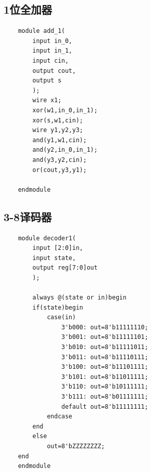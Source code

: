 \documentclass[fontset=windows,12pt]{article}
\begin{document}
    \subsection{1位全加器}
    {\setmainfont{Courier New Bold}                          %
    \begin{lstlisting}
    module add_1(
        input in_0,
        input in_1,
        input cin,
        output cout,
        output s
        );
        wire x1;
        xor(w1,in_0,in_1);
        xor(s,w1,cin);
        wire y1,y2,y3;
        and(y1,w1,cin);
        and(y2,in_0,in_1);
        and(y3,y2,cin);
        or(cout,y3,y1);
        
    endmodule
    \end{lstlisting}}
    \subsection{3-8译码器}
    {\setmainfont{Courier New Bold}                          %
    \begin{lstlisting}
    module decoder1(
        input [2:0]in,
        input state,
        output reg[7:0]out
        );
    
        always @(state or in)begin
        if(state)begin
            case(in)
                3'b000: out=8'b11111110;
                3'b001: out=8'b11111101;
                3'b010: out=8'b11111011;
                3'b011: out=8'b11110111;
                3'b100: out=8'b11101111;
                3'b101: out=8'b11011111;
                3'b110: out=8'b10111111;
                3'b111: out=8'b01111111;
                default out=8'b11111111;
            endcase
        end
        else 
            out=8'bZZZZZZZZ;
    end
    endmodule
    \end{lstlisting}}
\end{document}

